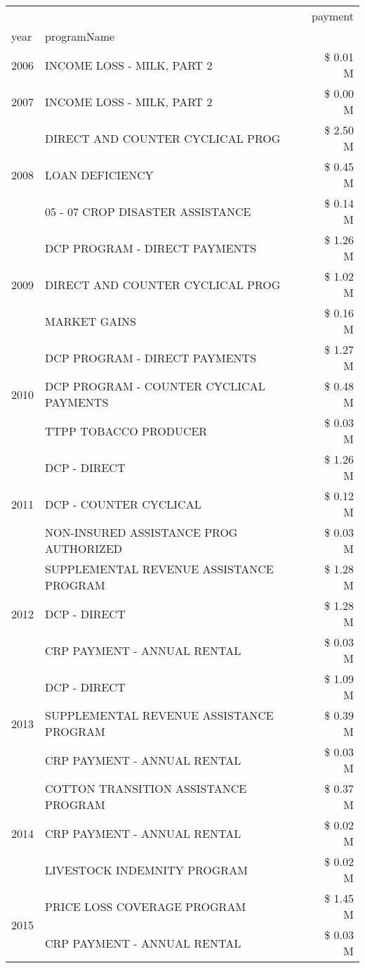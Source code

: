 \begin{tabular}{llr}
\toprule
 &  & payment \\
year & programName &  \\
\midrule
2006 & INCOME LOSS - MILK, PART 2 & \$ 0.01 M \\
\cline{1-3}
2007 & INCOME LOSS - MILK, PART 2 & \$ 0.00 M \\
\cline{1-3}
\multirow[t]{3}{*}{2008} & DIRECT AND COUNTER CYCLICAL PROG & \$ 2.50 M \\
 & LOAN DEFICIENCY & \$ 0.45 M \\
 & 05 - 07 CROP DISASTER ASSISTANCE & \$ 0.14 M \\
\cline{1-3}
\multirow[t]{3}{*}{2009} & DCP PROGRAM - DIRECT PAYMENTS & \$ 1.26 M \\
 & DIRECT AND COUNTER CYCLICAL PROG & \$ 1.02 M \\
 & MARKET GAINS & \$ 0.16 M \\
\cline{1-3}
\multirow[t]{3}{*}{2010} & DCP PROGRAM - DIRECT PAYMENTS & \$ 1.27 M \\
 & DCP PROGRAM - COUNTER CYCLICAL PAYMENTS & \$ 0.48 M \\
 & TTPP TOBACCO PRODUCER & \$ 0.03 M \\
\cline{1-3}
\multirow[t]{3}{*}{2011} & DCP - DIRECT & \$ 1.26 M \\
 & DCP - COUNTER CYCLICAL & \$ 0.12 M \\
 & NON-INSURED ASSISTANCE PROG AUTHORIZED & \$ 0.03 M \\
\cline{1-3}
\multirow[t]{3}{*}{2012} & SUPPLEMENTAL REVENUE ASSISTANCE PROGRAM & \$ 1.28 M \\
 & DCP - DIRECT & \$ 1.28 M \\
 & CRP PAYMENT - ANNUAL RENTAL & \$ 0.03 M \\
\cline{1-3}
\multirow[t]{3}{*}{2013} & DCP - DIRECT & \$ 1.09 M \\
 & SUPPLEMENTAL REVENUE ASSISTANCE PROGRAM & \$ 0.39 M \\
 & CRP PAYMENT - ANNUAL RENTAL & \$ 0.03 M \\
\cline{1-3}
\multirow[t]{3}{*}{2014} & COTTON TRANSITION ASSISTANCE PROGRAM & \$ 0.37 M \\
 & CRP PAYMENT - ANNUAL RENTAL & \$ 0.02 M \\
 & LIVESTOCK INDEMNITY PROGRAM & \$ 0.02 M \\
\cline{1-3}
\multirow[t]{3}{*}{2015} & PRICE LOSS COVERAGE PROGRAM & \$ 1.45 M \\
 & CRP PAYMENT - ANNUAL RENTAL & \$ 0.03 M \\

\end{tabular}
